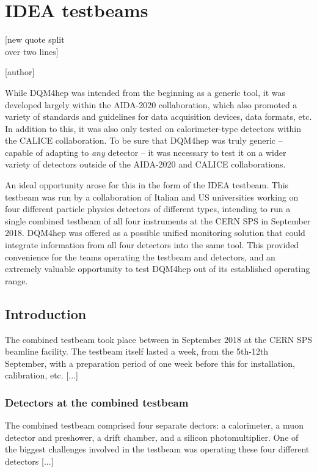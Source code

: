 \chapter{IDEA testbeams}
\label{chapter:ideatestbeam}

\epigraph{[new quote split \\ over two lines]}{[author]}

While DQM4hep was intended from the beginning as a generic tool, it was developed largely within the AIDA-2020 collaboration, which also promoted a variety of standards and guidelines for data acquisition devices, data formats, etc. In addition to this, it was also only tested on calorimeter-type detectors within the CALICE collaboration. To be sure that DQM4hep was truly generic -- capable of adapting to \textit{any} detector -- it was necessary to test it on a wider variety of detectors outside of the AIDA-2020 and CALICE collaborations.

An ideal opportunity arose for this in the form of the IDEA testbeam. This testbeam was run by a collaboration of Italian and US universities working on four different particle physics detectors of different types, intending to run a single combined testbeam of all four instruments at the CERN \acrshort{SPS} in September 2018. DQM4hep was offered as a possible unified monitoring solution that could integrate information from all four detectors into the same tool. This provided convenience for the teams operating the testbeam and detectors, and an extremely valuable opportunity to test DQM4hep out of its established operating range.

\section{Introduction}
The combined testbeam took place between in September 2018 at the CERN SPS beamline facility. The testbeam itself lasted a week, from the 5th-12th September, with a preparation period of one week before this for installation, calibration, etc. [...]

\subsection*{Detectors at the combined testbeam}
The combined testbeam comprised four separate dectors: a calorimeter, a muon detector and preshower, a drift chamber, and a silicon photomultiplier. One of the biggest challenges involved in the testbeam was operating these four different detectors [...]

